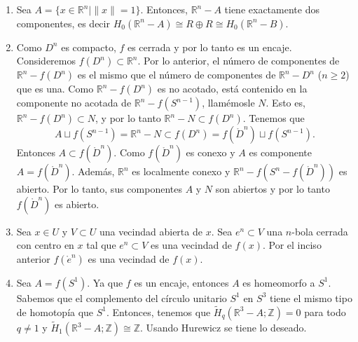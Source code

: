\documentclass[11pt,a4paper]{article}
\theoremstyle{plain}
\theoremstyle{definition}
\theoremstyle{remark}
\newcommand{\RR}{\mathbb R}
\newcommand{\ZZ}{\mathbb Z}
\begin{document}
\begin{enumerate}[label=\arabic*.,leftmargin=*]
\begin{enumerate}[label=\alph*)]
Por lo tanto, $\RR^{n+1}-B$ tiene dos componentes. Si $B\subsetneq\RR^n$,
entonces $\RR^{n+1}-B$ tendría una sola componente, lo cual es absurdo.
Por lo tanto, $B=\RR^n$. Así, $A=\RR^n$ y $B=\RR^n$ y el resultado es
cierto.
\item Sea $A=\{x\in\RR^n\mid\|x\|=1\}$. Entonces, $\RR^n-A$ tiene
exactamente dos componentes, es decir
$H_0(\RR^n-A)\cong R\oplus R\cong H_0(\RR^n-B)$.
\item Como $D^n$ es compacto, $f$ es cerrada y por lo tanto es un encaje.
Consideremos $f(D^n)\subset\RR^n$. Por lo anterior, el número de
componentes de $\RR^n-f(D^n)$ es el mismo que el número de componentes de
$\RR^n-D^n$ ($n\ge2$) que es una. Como $\RR^n-f(D^n)$ es no acotado, está
contenido en la componente no acotada de $\RR^n-f(S^{n-1})$, llamémosle
$N$. Esto es, $\RR^n-f(D^n)\subset N$, y por lo tanto $\RR^n-N\subset f(D^n)$.
Tenemos que
\[
A\sqcup f(S^{n-1})=\RR^n-N\subset f(D^n)=f(\mathring D^n)\sqcup f(S^{n-1}).
\]
Entonces $A\subset f(\mathring D^n)$. Como $f(\mathring D^n)$ es conexo y
$A$ es componente $A=f(\mathring D^n)$. Además, $\RR^n$ es localmente
conexo y $\RR^n-f(S^n-f(\mathring D^n))$ es abierto. Por lo tanto, sus
componentes $A$ y $N$ son abiertos y por lo tanto $f(\mathring D^n)$ es
abierto.
\item Sea $x\in U$ y $V\subset U$ una vecindad abierta de $x$. Sea
$e^n\subset V$ una $n$-bola cerrada con centro en $x$ tal que
$e^n\subset V$ es una vecindad de $f(x)$. Por el inciso anterior
$f(\mathring e^n)$ es una vecindad de $f(x)$.
\item Sea $A=f(S^1)$. Ya que $f$ es un encaje, entonces $A$ es homeomorfo
a $S^1$. Sabemos que el complemento del círculo unitario $S^1$ en $S^3$
tiene el mismo tipo de homotopía que $S^1$. Entonces, tenemos que
$\tilde H_q(\RR^3-A;\ZZ)=0$ para todo $q\ne1$ y
$\tilde H_1(\RR^3-A;\ZZ)\cong\ZZ$. Usando Hurewicz se tiene lo deseado.
\end{enumerate}


\end{enumerate}
\end{document}
